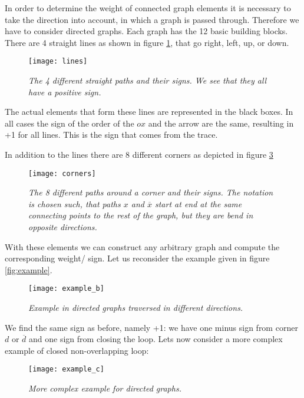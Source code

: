 In order to determine the weight of connected graph elements it is necessary to take
the direction into account, in which a graph is passed through. Therefore we have to consider directed graphs. Each graph has the  12 basic building blocks. There are 4 straight lines
as shown in figure \ref{fig:lines}, that go right, left, up, or down. 
%
\begin{figure}[h]
\begin{center}
\texttt{[image: lines]}
\caption{{\it The 4 different straight paths  and their signs. We see that they all have a positive sign.\label{fig:lines}}}
\end{center}
\end{figure}
%
The actual elements that form these lines are represented in the black boxes. In all cases the sign of the order of the \modes $ox$ and the arrow are the same, resulting in +1 for all 
lines. This is the sign that comes from the trace.

\clearpage
In addition to the lines  there are 8 different corners as depicted in 
figure \ref{fig:directed:graphs}
%
\begin{figure}[h]
\begin{center}
\texttt{[image: corners]}
\caption{{\it The 8 different paths around a corner and their signs. The notation is chosen such, that paths $x$ and $\overline x$ start at end at the same connecting points to the rest of the graph, but they are bend in opposite directions.\label{fig:directed:graphs}}}
\end{center}
\end{figure}
%
With these elements we can construct any arbitrary graph  and compute the corresponding weight/ sign. Let us reconsider the example given in figure \ref{fig:example}.
\begin{figure}[h]
\begin{center}
\texttt{[image: example\_b]}
\caption{{\it Example in directed graphs traversed in different directions.\label{fig:directed:graphs}}}
\end{center}
\end{figure}
%
We find the same sign as before, namely +1: we have one minus sign from corner $d$ or $\overline d$ and one sign from closing the loop. 
Lets now consider a more complex example of  closed non-overlapping loop:
%
\begin{figure}[h]
\begin{center}
\texttt{[image: example\_c]}
\caption{{\it More complex example for directed graphs.\label{fig:directed:graphs_more}}}
\end{center}
\end{figure}
%

